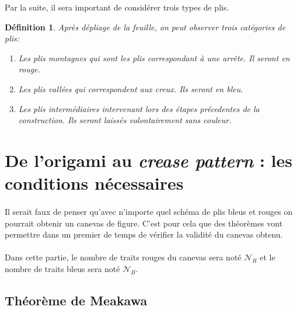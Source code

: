 \documentclass[a4paper,12pt,french,draft]{report}
\newtheorem{definition}{Définition}[section]
\begin{document}
    Par la suite, il sera important de considérer trois types de plis.
    
      \begin{definition}
      
        Après dépliage de la feuille, on peut observer trois 
        catégories de plis:
        
        \begin{enumerate}
        
          \item Les plis \emph{montagnes} qui sont les plis correspondant à 
          une arrête. Il seront en rouge.
          \item Les plis \emph{vallées} qui correspondent aux creux. Ils 
          seront en bleu.
          \item Les plis intermédiaires intervenant lors des étapes 
          précedentes de la construction. Ils seront laissés 
          volontairement sans couleur.
        
        \end{enumerate}
      
      \end{definition}
    
    
    

  \section{De l'origami au \emph{crease pattern} : les conditions 
  nécessaires}  
  
    \paragraph{} Il serait faux de penser qu’avec n’importe quel schéma de plis bleus et rouges on pourrait obtenir un canevas de figure. C’est pour cela que des théorèmes vont permettre dans un premier de temps de vérifier la validité du canevas obtenu.
  
    
    
    \paragraph{} Dans cette partie, le nombre de traits rouges du canevas sera noté \(\mathscr{N}_{R}\) et le nombre de traits bleus sera noté \(\mathscr{N}_{B}\).
    
    \subsection{Théorème de Meakawa}
    
\end{document}
